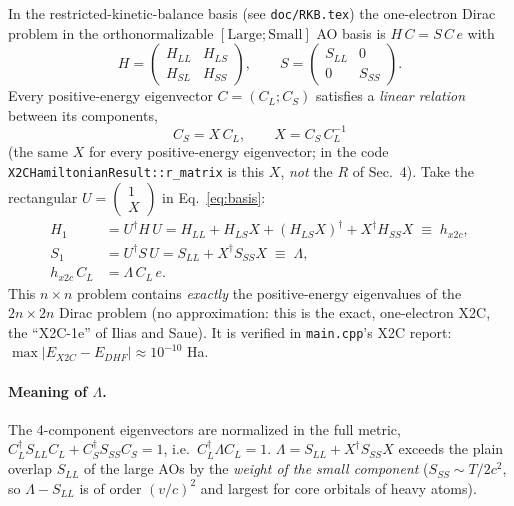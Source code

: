 \documentclass[11pt]{article}
\newcommand{\dg}{^{\dagger}}
\begin{document}
In the restricted-kinetic-balance basis (see \texttt{doc/RKB.tex}) the one-electron Dirac problem in the
orthonormalizable $[\text{Large};\text{Small}]$ AO basis is $H\,C = S\,C\,e$ with
\begin{equation}
H = \begin{pmatrix} H_{LL} & H_{LS}\\ H_{SL} & H_{SS}\end{pmatrix},\qquad
S = \begin{pmatrix} S_{LL} & 0\\ 0 & S_{SS}\end{pmatrix}.
\end{equation}
Every positive-energy eigenvector $C=(C_L;C_S)$ satisfies a \emph{linear relation} between its components,
\begin{equation}
C_S = X\,C_L,\qquad X = C_S\,C_L^{-1}
\end{equation}
(the same $X$ for every positive-energy eigenvector; in the code \texttt{X2CHamiltonianResult::r\_matrix} is this
$X$, \emph{not} the $R$ of Sec.~4). Take the rectangular $U = \begin{pmatrix}1\\ X\end{pmatrix}$ in Eq.~\eqref{eq:basis}:
\begin{align}
H_1 &= U\dg H\,U = H_{LL} + H_{LS}X + (H_{LS}X)\dg + X\dg H_{SS}X \;\equiv\; h_{x2c},\label{eq:hx2c}\\
S_1 &= U\dg S\,U = S_{LL} + X\dg S_{SS}X \;\equiv\; \Lambda,\label{eq:lambda}\\
h_{x2c}\,C_L &= \Lambda\,C_L\, e. \label{eq:gen}
\end{align}
This $n\times n$ problem contains \emph{exactly} the positive-energy eigenvalues of the $2n\times 2n$ Dirac problem
(no approximation: this is the exact, one-electron X2C, the ``X2C-1e'' of Ilias and Saue). It is verified in
\texttt{main.cpp}'s X2C report: $\max|E_{X2C}-E_{DHF}|\approx 10^{-10}$ Ha.

\paragraph{Meaning of $\Lambda$.}
The 4-component eigenvectors are normalized in the full metric, $C_L\dg S_{LL}C_L + C_S\dg S_{SS}C_S = 1$,
i.e.\ $C_L\dg\Lambda C_L = 1$. $\Lambda = S_{LL} + X\dg S_{SS}X$ exceeds the plain overlap $S_{LL}$ of the large AOs by the
\emph{weight of the small component} ($S_{SS}\sim T/2c^2$, so $\Lambda-S_{LL}$ is of order $(v/c)^2$ and largest for
core orbitals of heavy atoms).
\end{document}
